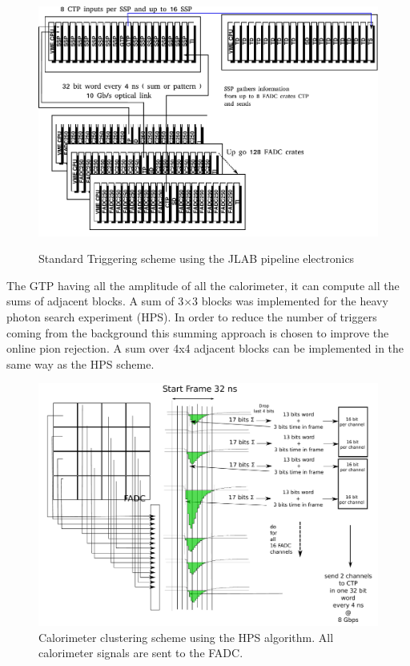 \documentclass{article}
\begin{document}
\begin{figure}
  \centering
\includegraphics[width=\textwidth]{figs/TriggerPipeline.pdf}\\
  \caption{Standard Triggering scheme using the JLAB pipeline electronics}\label{fig:pipeline_daq}
\end{figure}

The GTP having all the amplitude of all the calorimeter, it can compute all the sums of adjacent blocks.
A sum of 3$\times$3 blocks was implemented for the heavy photon search experiment (HPS).
In order to reduce the number of triggers coming from the background this summing approach is chosen to improve the online pion rejection.
A sum over 4x4 adjacent blocks can be implemented in the same way as the HPS scheme. 

\begin{figure}
  \centering
 \includegraphics[width=\textwidth]{figs/CaloTrigger.pdf}
  \caption{Calorimeter clustering scheme using the HPS algorithm. All calorimeter signals are sent to the FADC. }\label{fig:ClustHPS}
\end{figure}
\end{document}
